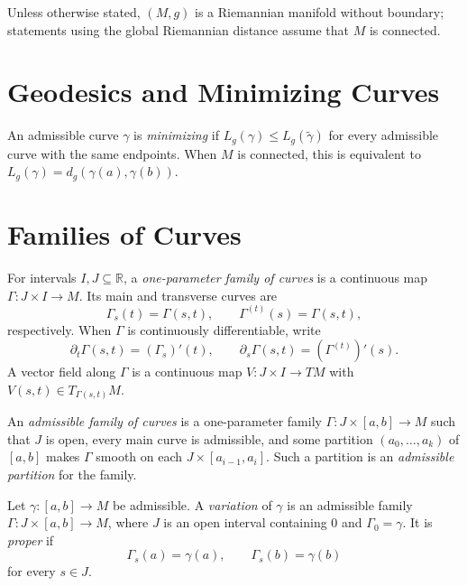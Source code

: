 Unless otherwise stated, $(M,g)$ is a Riemannian manifold without boundary;
statements using the global Riemannian distance assume that $M$ is connected.

\section{Geodesics and Minimizing Curves}

An admissible curve $\gamma$ is \emph{minimizing} if
$L_g(\gamma)\leq L_g(\widetilde\gamma)$ for every admissible curve with the
same endpoints.  When $M$ is connected, this is equivalent to
$L_g(\gamma)=d_g(\gamma(a),\gamma(b))$.

\section{Families of Curves}

\begin{definition}
\label{def:one-parameter-family-of-curves}

For intervals $I,J\subseteq\mathbb R$, a \emph{one-parameter family of
curves} is a continuous map $\Gamma:J\times I\to M$.  Its main and transverse
curves are
\[
\Gamma_s(t)=\Gamma(s,t),
\qquad
\Gamma^{(t)}(s)=\Gamma(s,t),
\]
respectively.  When $\Gamma$ is continuously differentiable, write
\[
\partial_t\Gamma(s,t)=(\Gamma_s)'(t),
\qquad
\partial_s\Gamma(s,t)=(\Gamma^{(t)})'(s).
\]
A vector field along $\Gamma$ is a continuous map $V:J\times I\to TM$ with
$V(s,t)\in T_{\Gamma(s,t)}M$.
\end{definition}

An \emph{admissible family of curves} is a one-parameter family
$\Gamma:J\times[a,b]\to M$ such that $J$ is open, every main curve is
admissible, and some partition $(a_0,\ldots,a_k)$ of $[a,b]$ makes $\Gamma$
smooth on each $J\times[a_{i-1},a_i]$.  Such a partition is an
\emph{admissible partition} for the family.

\begin{definition}[Variations]
\label{def:variations-proper-variations}

Let $\gamma:[a,b]\to M$ be admissible.  A \emph{variation} of $\gamma$ is an
admissible family $\Gamma:J\times[a,b]\to M$, where $J$ is an open interval
containing $0$ and $\Gamma_0=\gamma$.  It is \emph{proper} if
\[
\Gamma_s(a)=\gamma(a),
\qquad
\Gamma_s(b)=\gamma(b)
\]
for every $s\in J$.
\end{definition}

